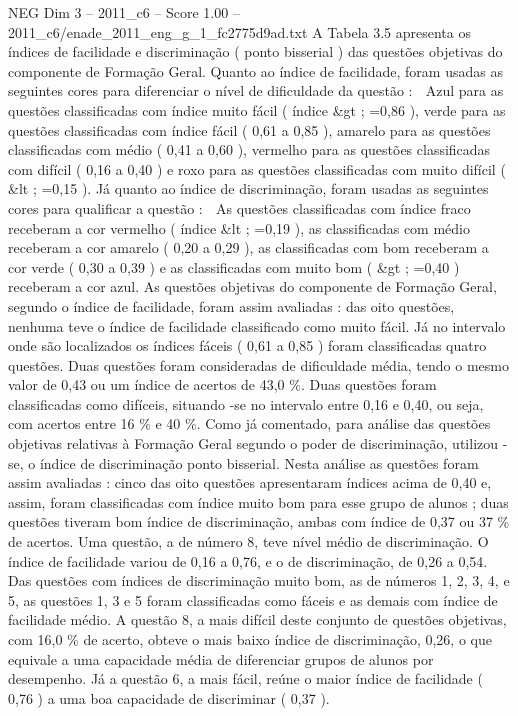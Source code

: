 \begin{textsample}{NEG Dim 3 – 2011\_c6 – Score 1.00 – 2011\_c6/enade\_2011\_eng\_g\_1\_fc2775d9ad.txt}
A Tabela 3.5 apresenta os índices de facilidade e discriminação ( ponto bisserial ) das questões objetivas do componente de Formação Geral.
Quanto ao índice de facilidade, foram usadas as seguintes cores para diferenciar o nível de dificuldade da questão :  Azul para as questões classificadas com índice muito fácil ( índice \&gt ; =0,86 ), verde para as questões classificadas com índice fácil ( 0,61 a 0,85 ), amarelo para as questões classificadas com médio ( 0,41 a 0,60 ), vermelho para as questões classificadas com difícil ( 0,16 a 0,40 ) e roxo para as questões classificadas com muito difícil ( \&lt ; =0,15 ).
Já quanto ao índice de discriminação, foram usadas as seguintes cores para qualificar a questão :  As questões classificadas com índice fraco receberam a cor vermelho ( índice \&lt ; =0,19 ), as classificadas com médio receberam a cor amarelo ( 0,20 a 0,29 ), as classificadas com bom receberam a cor verde ( 0,30 a 0,39 ) e as classificadas com muito bom ( \&gt ; =0,40 ) receberam a cor azul.
As questões objetivas do componente de Formação Geral, segundo o índice de facilidade, foram assim avaliadas : das oito questões, nenhuma teve o índice de facilidade classificado como muito fácil.
Já no intervalo onde são localizados os índices fáceis ( 0,61 a 0,85 ) foram classificadas quatro questões.
Duas questões foram consideradas de dificuldade média, tendo o mesmo valor de 0,43 ou um índice de acertos de 43,0 \%.
Duas questões foram classificadas como difíceis, situando -se no intervalo entre 0,16 e 0,40, ou seja, com acertos entre 16 \% e 40 \%.
Como já comentado, para análise das questões objetivas relativas à Formação Geral segundo o poder de discriminação, utilizou -se, o índice de discriminação ponto bisserial.
Nesta análise as questões foram assim avaliadas : cinco das oito questões apresentaram índices acima de 0,40 e, assim, foram classificadas com índice muito bom para esse grupo de alunos ; duas questões tiveram bom índice de discriminação, ambas com índice de 0,37 ou 37 \% de acertos.
Uma questão, a de número 8, teve nível médio de discriminação.
O índice de facilidade variou de 0,16 a 0,76, e o de discriminação, de 0,26 a 0,54.
Das questões com índices de discriminação muito bom, as de números 1, 2, 3, 4, e 5, as questões 1, 3 e 5 foram classificadas como fáceis e as demais com índice de facilidade médio.
A questão 8, a mais difícil deste conjunto de questões objetivas, com 16,0 \% de acerto, obteve o mais baixo índice de discriminação, 0,26, o que equivale a uma capacidade média de diferenciar grupos de alunos por desempenho.
Já a questão 6, a mais fácil, reúne o maior índice de facilidade ( 0,76 ) a uma boa capacidade de discriminar ( 0,37 ).

\end{textsample}
